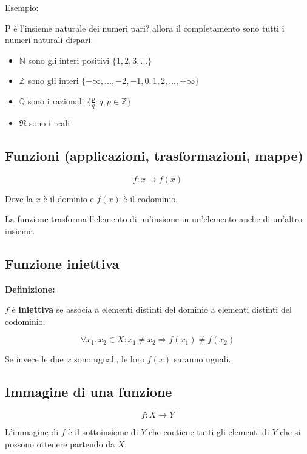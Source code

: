 Esempio:

P è l'insieme naturale dei numeri pari? allora il completamento sono tutti i numeri naturali dispari.


\begin{itemize}
    \item $\mathbb{N}$ sono gli interi positivi $\{1,2,3,\dots\}$
    \item $\mathbb{Z}$ sono gli interi $\{-\infty, \dots, -2, -1, 0, 1, 2, \dots, +\infty\}$
    \item $\mathbb{Q}$ sono i razionali $\{\frac{p}{q} : q,p \in \mathbb{Z}\}$
    \item $\Re$ sono i reali
\end{itemize}

\subsection{Funzioni (applicazioni, trasformazioni, mappe)}
\begin{equation*}
    f: x \rightarrow f(x)
\end{equation*}

Dove la $x$ è il dominio e $f(x)$ è il codominio.

La funzione trasforma l'elemento di un'insieme in un'elemento anche di un'altro insieme.

\subsection{Funzione iniettiva}
\textbf{Definizione:}

$f$ è \textbf{iniettiva} se associa a elementi distinti del dominio a elementi distinti del codominio.

\begin{equation*}
    \forall x_1, x_2 \in X : x_1 \neq x_2 \Rightarrow f(x_1) \neq f(x_2)
\end{equation*}

Se invece le due $x$ sono uguali, le loro $f(x)$ saranno uguali.

\subsection{Immagine di una funzione}

\begin{equation*}
    f : X \rightarrow Y
\end{equation*}

L'immagine di $f$ è il sottoinsieme di $Y$ che contiene tutti gli elementi di $Y$ che si possono ottenere partendo da $X$.


